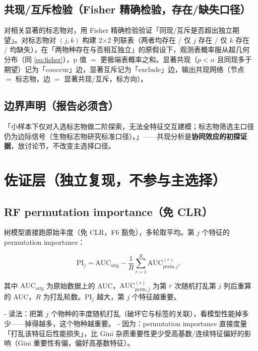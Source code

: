 \documentclass{internal-report}
\begin{document}
\subsection{共现/互斥检验（Fisher 精确检验，存在/缺失口径）}
\label{sec:cooccur-fisher}

对相关显著的标志物对，用 Fisher 精确检验验证「同现/互斥是否超出独立期望」。对标志物对 $(j,k)$ 构建 2$\times$2 列联表（两者均存在 / 仅 $j$ 存在 / 仅 $k$ 存在 / 均缺失），在「两物种存在与否相互独立」的原假设下，观测表概率服从超几何分布（同 \eqref{eq:fisher}），p 值 $=$ 更极端表概率之和。显著共现（$p<\alpha$ 且同现多于期望）记为「cooccur」边，显著互斥记为「exclude」边，输出共现网络（节点 $=$ 标志物，边 $=$ 显著共现/互斥，标方向）。

\subsection{边界声明（报告必须含）}
\label{sec:boundary}

「小样本下仅对入选标志物做二阶探索，无法全特征交互建模；标志物筛选主口径仍为边际信号（生物标志物研究标准口径）。」——共现分析是\textbf{协同效应的初探证据}，放讨论节，不改变主选择口径。

\section{佐证层（独立复现，不参与主选择）}
\label{sec:corroborate}

\subsection{RF permutation importance（免 CLR）}
\label{sec:rf}

树模型直接跑原始丰度（免 CLR，F6 豁免），多轮取平均。第 $j$ 个特征的 permutation importance：

\begin{equation}
  \mathrm{PI}_j = \mathrm{AUC}_{\text{orig}} - \frac{1}{R}\sum_{r=1}^{R}\mathrm{AUC}_{\text{perm},j}^{(r)},
  \label{eq:permimp}
\end{equation}

其中 $\mathrm{AUC}_{\text{orig}}$ 为原始数据上的 AUC，$\mathrm{AUC}_{\text{perm},j}^{(r)}$ 为第 $r$ 次随机打乱第 $j$ 列后重算的 AUC，$R$ 为打乱轮数。$\mathrm{PI}_j$ 越大，第 $j$ 个特征越重要。

- 读法：把第 $j$ 个物种的丰度随机打乱（破坏它与标签的关联），看模型性能掉多少——掉得越多，这个物种越重要。
- 因为：permutation importance 直接度量「打乱该特征后性能损失」，比 Gini 杂质重要性更少受高基数/连续特征偏好的影响（Gini 重要性有偏，偏好高基数特征）。
\end{document}
